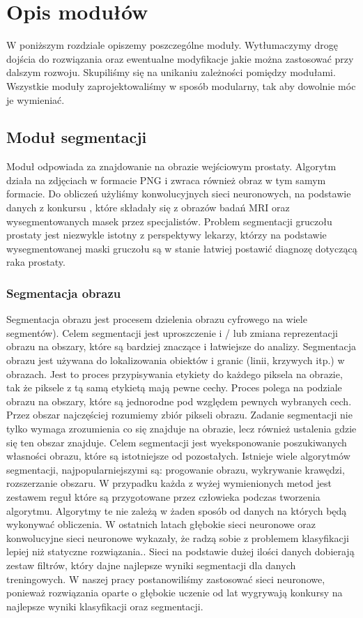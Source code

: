 \documentclass[a4paper,11pt,twoside]{report}
\theoremstyle{definition}
\begin{document}
\chapter{Opis modułów}

W poniższym rozdziale opiszemy poszczególne moduły. Wytłumaczymy drogę dojścia do rozwiązania oraz ewentualne modyfikacje jakie można zastosować przy dalszym rozwoju. Skupiliśmy się na unikaniu zależności pomiędzy modułami. Wszystkie moduły zaprojektowaliśmy w sposób modularny, tak aby dowolnie móc je wymieniać. 

\section{Moduł segmentacji}

Moduł odpowiada za znajdowanie na obrazie wejściowym prostaty. Algorytm działa na zdjęciach w formacie PNG i zwraca również obraz w tym samym formacie. Do obliczeń użyliśmy konwolucyjnych sieci neuronowych, na podstawie danych z konkursu \cite{konkurs}, które składały się  z obrazów badań MRI oraz wysegmentowanych masek przez specjalistów. Problem segmentacji gruczołu prostaty jest niezwykle istotny z perspektywy lekarzy, którzy na podstawie wysegmentowanej maski gruczołu są w stanie łatwiej postawić diagnozę dotyczącą raka prostaty.

\subsection{Segmentacja obrazu}

Segmentacja obrazu jest procesem dzielenia obrazu cyfrowego na wiele segmentów). Celem segmentacji jest uproszczenie i / lub zmiana reprezentacji obrazu na obszary, które są bardziej znaczące i łatwiejsze do analizy. Segmentacja obrazu jest używana do lokalizowania obiektów i granic (linii, krzywych itp.) w obrazach. Jest to proces przypisywania etykiety do każdego piksela na obrazie, tak że piksele z tą samą etykietą mają pewne cechy. Proces polega na podziale obrazu na  obszary, które są jednorodne pod względem pewnych wybranych cech. Przez obszar najczęściej rozumiemy zbiór pikseli obrazu. Zadanie segmentacji nie tylko wymaga zrozumienia co się znajduje na obrazie, lecz również ustalenia gdzie się ten obszar znajduje. Celem segmentacji jest wyeksponowanie  poszukiwanych własności obrazu, które są istotniejsze od pozostałych. Istnieje wiele algorytmów segmentacji, najpopularniejszymi są: progowanie obrazu, wykrywanie krawędzi, rozszerzanie obszaru. W przypadku każda z wyżej wymienionych metod jest zestawem reguł które są przygotowane przez człowieka podczas tworzenia algorytmu. Algorytmy te nie zależą w żaden sposób od danych na których będą wykonywać obliczenia. W ostatnich latach głębokie sieci neuronowe oraz konwolucyjne sieci neuronowe wykazały, że radzą sobie z problemem klasyfikacji lepiej niż statyczne rozwiązania.\cite{imageOrg}. Sieci na podstawie dużej ilości danych dobierają zestaw filtrów, który dajne najlepsze wyniki segmentacji dla danych treningowych. W naszej pracy postanowiliśmy zastosować sieci neuronowe, ponieważ rozwiązania oparte o głębokie uczenie od lat wygrywają konkursy na najlepsze wyniki  klasyfikacji oraz segmentacji. 
\end{document}
